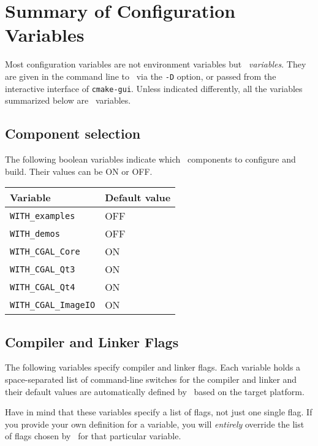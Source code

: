 \section{Summary of Configuration Variables}

Most configuration variables are not environment variables but {\em \cmake\ variables}. They are given in the command line to \cmake\ via the \texttt{-D} option, 
or passed from the interactive interface of \texttt{cmake-gui}. Unless
indicated differently, all the variables summarized below are \cmake\ variables.

\subsection{Component selection}

The following boolean variables indicate which \cgal\ components to configure and build. Their values can be ON or OFF.

{\ccTexHtml{\small}{}
\renewcommand{\arraystretch}{1.3}
\gdef\lcTabularBorder{2}
\begin{tabular}{|l|l|} \hline
  \textbf{Variable}            & \textbf{Default value}\\\hline\hline
  \texttt{WITH\_examples}      & OFF\\\hline
  \texttt{WITH\_demos}         & OFF\\\hline
  \texttt{WITH\_CGAL\_Core}    & ON\\\hline
  \texttt{WITH\_CGAL\_Qt3}     & ON\\\hline
  \texttt{WITH\_CGAL\_Qt4}     & ON\\\hline
  \texttt{WITH\_CGAL\_ImageIO} & ON\\\hline
\end{tabular}
}

\subsection{Compiler and Linker Flags}

The following variables specify compiler and linker flags. Each variable holds a 
space-separated list of command-line switches for the compiler and linker and 
their default values are automatically defined by \cmake\ based on the target platform.

Have in mind that these variables specify a list of flags, not just one
single flag. If you provide your own definition for a variable, you will {\em entirely} override
the list of flags chosen by \cmake\ for that particular variable.

